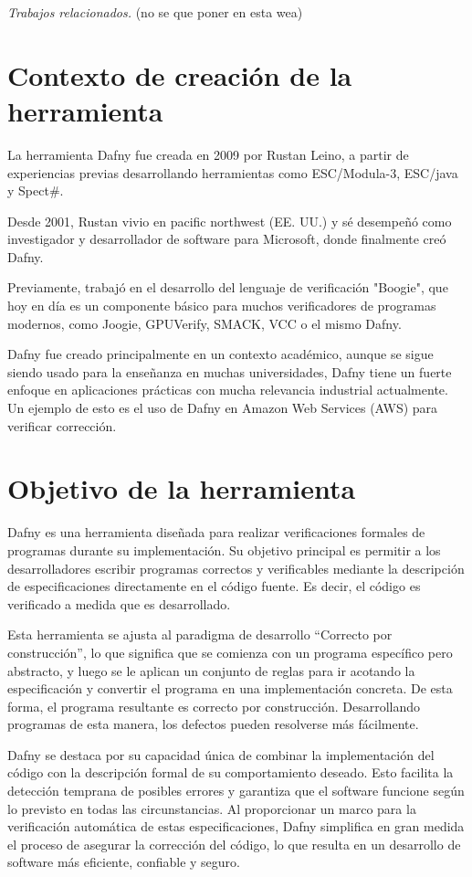 \documentclass[runningheads]{llncs}
\begin{document}
\emph{Trabajos relacionados.} (no se que poner en esta wea)

\section{Contexto de creación de la herramienta}

La herramienta Dafny fue creada en 2009 por Rustan Leino,
a partir de experiencias previas desarrollando herramientas como ESC/Modula-3, ESC/java y Spect\#.

Desde 2001, Rustan vivio en pacific northwest (EE. UU.) y sé desempeñó como investigador y desarrollador de software para Microsoft,
donde finalmente creó Dafny.

Previamente, trabajó en el desarrollo del lenguaje de verificación "Boogie",
que hoy en día es un componente básico para muchos verificadores de programas modernos,
como Joogie, GPUVerify, SMACK, VCC o el mismo Dafny.

Dafny fue creado principalmente en un contexto académico, 
aunque se sigue siendo usado para la enseñanza en muchas universidades, 
Dafny tiene un fuerte enfoque en aplicaciones prácticas con mucha relevancia industrial actualmente.
Un ejemplo de esto es el uso de Dafny en Amazon Web Services (AWS) para verificar corrección.

\section{Objetivo de la herramienta}

Dafny es una herramienta diseñada para realizar verificaciones formales de programas durante su implementación.
Su objetivo principal es permitir a los desarrolladores escribir programas correctos y verificables mediante la descripción
de especificaciones directamente en el código fuente. Es decir, el código es verificado a medida que es desarrollado.

Esta herramienta se ajusta al paradigma de desarrollo ``Correcto por construcción'', lo que significa que se comienza
con un programa específico pero abstracto, y luego se le aplican un conjunto de reglas para ir acotando la especificación
y convertir el programa en una implementación concreta. De esta forma, el programa resultante es correcto por construcción.
Desarrollando programas de esta manera, los defectos pueden resolverse más fácilmente.

Dafny se destaca por su capacidad única de combinar la implementación del código con la descripción formal de su comportamiento
deseado. Esto facilita la detección temprana de posibles errores y garantiza que el software funcione según lo previsto en todas
las circunstancias. Al proporcionar un marco para la verificación automática de estas especificaciones, Dafny simplifica en gran
medida el proceso de asegurar la corrección del código, lo que resulta en un desarrollo de software más eficiente, confiable y seguro.
\end{document}
